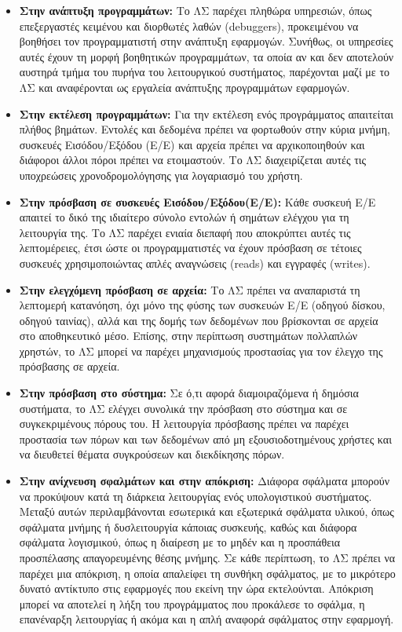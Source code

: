 \documentclass{report}
\begin{document}
\begin{itemize}
    \item \textbf{Στην ανάπτυξη προγραμμάτων:} Το ΛΣ παρέχει πληθώρα υπηρεσιών, όπως επεξεργαστές κειμένου και διορθωτές λαθών ({debuggers}), προκειμένου να βοηθήσει τον προγραμματιστή στην ανάπτυξη εφαρμογών. Συνήθως, οι υπηρεσίες αυτές έχουν τη μορφή βοηθητικών προγραμμάτων, τα οποία αν και δεν αποτελούν αυστηρά τμήμα του πυρήνα του λειτουργικού συστήματος, παρέχονται μαζί με το ΛΣ και αναφέρονται ως εργαλεία ανάπτυξης προγραμμάτων εφαρμογών.
    \item \textbf{Στην εκτέλεση προγραμμάτων:} Για την εκτέλεση ενός προγράμματος απαιτείται πλήθος βημάτων. Εντολές και δεδομένα πρέπει να φορτωθούν στην κύρια μνήμη, συσκευές Εισόδου/Εξόδου (Ε/Ε) και αρχεία πρέπει να αρχικοποιηθούν και διάφοροι άλλοι πόροι πρέπει να ετοιμαστούν. Το ΛΣ διαχειρίζεται αυτές τις υποχρεώσεις χρονοδρομολόγησης για λογαριασμό του χρήστη.
    \item \textbf{Στην πρόσβαση σε συσκευές Εισόδου/Εξόδου(Ε/Ε):} Κάθε συσκευή Ε/Ε απαιτεί το δικό της ιδιαίτερο σύνολο εντολών ή σημάτων ελέγχου για τη λειτουργία της. Το ΛΣ παρέχει ενιαία διεπαφή που αποκρύπτει αυτές τις λεπτομέρειες, έτσι ώστε οι προγραμματιστές να έχουν πρόσβαση σε τέτοιες συσκευές χρησιμοποιώντας απλές αναγνώσεις ({reads}) και εγγραφές ({writes}).
    \item \textbf{Στην ελεγχόμενη πρόσβαση σε αρχεία:} Το ΛΣ πρέπει να αναπαριστά τη λεπτομερή κατανόηση, όχι μόνο της φύσης των συσκευών Ε/Ε (οδηγού δίσκου, οδηγού ταινίας), αλλά και της δομής των δεδομένων που βρίσκονται σε αρχεία στο αποθηκευτικό μέσο. Επίσης, στην περίπτωση συστημάτων πολλαπλών χρηστών, το ΛΣ μπορεί να παρέχει μηχανισμούς προστασίας για τον έλεγχο της πρόσβασης σε αρχεία.
    \item \textbf{Στην πρόσβαση στο σύστημα:} Σε ό,τι αφορά διαμοιραζόμενα ή δημόσια συστήματα, το ΛΣ ελέγχει συνολικά την πρόσβαση στο σύστημα και σε συγκεκριμένους πόρους του. Η λειτουργία πρόσβασης πρέπει να παρέχει προστασία των πόρων και των δεδομένων από μη εξουσιοδοτημένους χρήστες και να διευθετεί θέματα συγκρούσεων και διεκδίκησης πόρων.
    \item \textbf{Στην ανίχνευση σφαλμάτων και στην απόκριση:} Διάφορα σφάλματα μπορούν να προκύψουν κατά τη διάρκεια λειτουργίας ενός υπολογιστικού συστήματος. Μεταξύ αυτών περιλαμβάνονται εσωτερικά και εξωτερικά σφάλματα υλικού, όπως σφάλματα μνήμης ή δυσλειτουργία κάποιας συσκευής, καθώς και διάφορα σφάλματα λογισμικού, όπως η διαίρεση με το μηδέν και η προσπάθεια προσπέλασης απαγορευμένης θέσης μνήμης. Σε κάθε περίπτωση, το ΛΣ πρέπει να παρέχει μια απόκριση, η οποία απαλείφει τη συνθήκη σφάλματος, με το μικρότερο δυνατό αντίκτυπο στις εφαρμογές που εκείνη την ώρα εκτελούνται. Απόκριση μπορεί να αποτελεί η λήξη του προγράμματος που προκάλεσε το σφάλμα, η επανέναρξη λειτουργίας ή ακόμα και η απλή αναφορά σφάλματος στην εφαρμογή.

\end{itemize}
\end{document}
